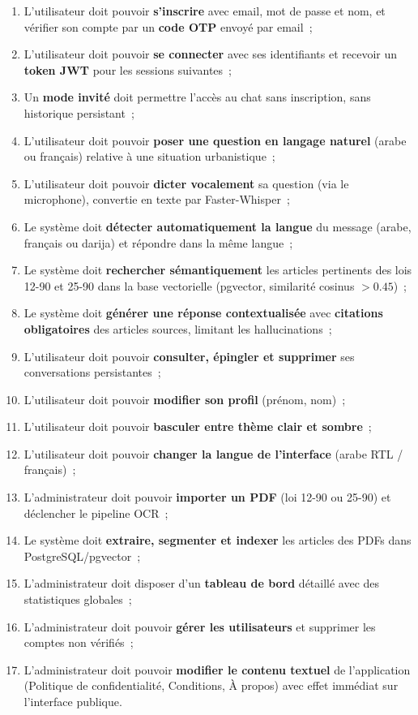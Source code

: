 \documentclass[12pt,a4paper]{report}
\begin{document}
\begin{enumerate}[label=\textbf{BF\arabic*~:}]
    \item L'utilisateur doit pouvoir \textbf{s'inscrire} avec email, mot de passe et nom, et vérifier son compte par un \textbf{code OTP} envoyé par email~;
    \item L'utilisateur doit pouvoir \textbf{se connecter} avec ses identifiants et recevoir un \textbf{token JWT} pour les sessions suivantes~;
    \item Un \textbf{mode invité} doit permettre l'accès au chat sans inscription, sans historique persistant~;
    \item L'utilisateur doit pouvoir \textbf{poser une question en langage naturel} (arabe ou français) relative à une situation urbanistique~;
    \item L'utilisateur doit pouvoir \textbf{dicter vocalement} sa question (via le microphone), convertie en texte par Faster-Whisper~;
    \item Le système doit \textbf{détecter automatiquement la langue} du message (arabe, français ou darija) et répondre dans la même langue~;
    \item Le système doit \textbf{rechercher sémantiquement} les articles pertinents des lois 12-90 et 25-90 dans la base vectorielle (pgvector, similarité cosinus $> 0.45$)~;
    \item Le système doit \textbf{générer une réponse contextualisée} avec \textbf{citations obligatoires} des articles sources, limitant les hallucinations~;
    \item L'utilisateur doit pouvoir \textbf{consulter, épingler et supprimer} ses conversations persistantes~;
    \item L'utilisateur doit pouvoir \textbf{modifier son profil} (prénom, nom)~;
    \item L'utilisateur doit pouvoir \textbf{basculer entre thème clair et sombre}~;
    \item L'utilisateur doit pouvoir \textbf{changer la langue de l'interface} (arabe RTL / français)~;
    \item L'administrateur doit pouvoir \textbf{importer un PDF} (loi 12-90 ou 25-90) et déclencher le pipeline OCR~;
    \item Le système doit \textbf{extraire, segmenter et indexer} les articles des PDFs dans PostgreSQL/pgvector~;
    \item L'administrateur doit disposer d'un \textbf{tableau de bord} détaillé avec des statistiques globales~;
    \item L'administrateur doit pouvoir \textbf{gérer les utilisateurs} et supprimer les comptes non vérifiés~;
    \item L'administrateur doit pouvoir \textbf{modifier le contenu textuel} de l'application (Politique de confidentialité, Conditions, À propos) avec effet immédiat sur l'interface publique.
\end{enumerate}
\end{document}
